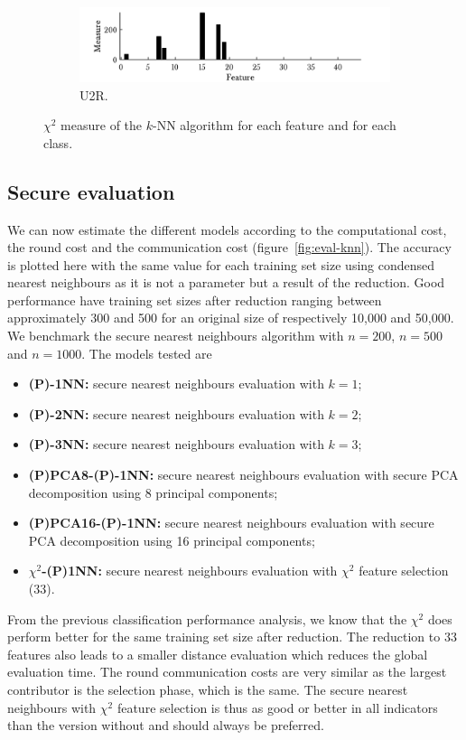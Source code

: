 \begin{figure}[h!]
\begin{subfigure}[b]{.87\textwidth}
        \end{subfigure}
        \vfill
        \begin{subfigure}[b]{.87\textwidth}  
            \centering 
            \includegraphics[width=.98\textwidth]{parts/chap-4/img-knn/cnn-chi2/u2r.png}
            \caption{U2R.} 
        \end{subfigure}
        \caption[Feature relevance using the $\chi^2$-measure with $k$-NN.]{$\chi^2$ measure of the $k$-NN algorithm for each feature and for each class.}
        \label{fig:knn-chi2-feat}
\end{figure}

\subsection{Secure evaluation}
We can now estimate the different models according to the computational cost, the round cost and the communication cost (figure~\ref{fig:eval-knn}). The accuracy is plotted here with the same value for each training set size using condensed nearest neighbours as it is not a parameter but a result of the reduction. Good performance have training set sizes after reduction ranging between approximately 300 and 500 for an original size of respectively 10,000 and 50,000. We benchmark the secure nearest neighbours algorithm with $n=200$, $n=500$ and $n=1000$. The models tested are
\begin{itemize}
    \item \textbf{(P)-1NN:} secure nearest neighbours evaluation with $k=1$;
    \item \textbf{(P)-2NN:} secure nearest neighbours evaluation with $k=2$;
    \item \textbf{(P)-3NN:} secure nearest neighbours evaluation with $k=3$;
    \item \textbf{(P)PCA8-(P)-1NN:} secure nearest neighbours evaluation with secure PCA decomposition using 8 principal components;
    \item \textbf{(P)PCA16-(P)-1NN:} secure nearest neighbours evaluation with secure PCA decomposition using 16 principal components;
    \item \textbf{$\chi^2$-(P)1NN:} secure nearest neighbours evaluation with $\chi^2$ feature selection (33).
\end{itemize}
From the previous classification performance analysis, we know that the $\chi^2$ does perform better for the same training set size after reduction. The reduction to 33 features also leads to a smaller distance evaluation which reduces the global evaluation time. The round communication costs are very similar as the largest contributor is the selection phase, which is the same. The secure nearest neighbours with $\chi^2$ feature selection is thus as good or better in all indicators than the version without and should always be preferred.

